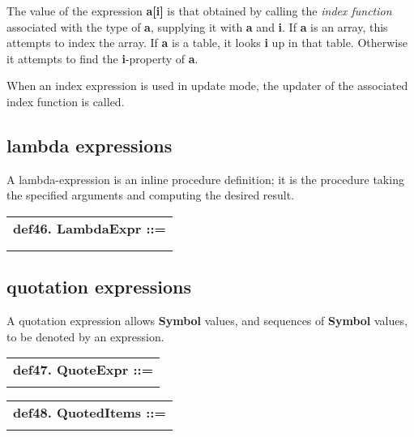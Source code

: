 \documentclass{report}
\begin{document}
The value of the expression {\bf a{[}i{]}} is that obtained by calling the
{\em index function} associated with the type of {\bf a}, supplying it with
{\bf a} and {\bf i}. If {\bf a} is an array, this attempts to index the array. If
{\bf a} is a table, it looks {\bf i} up in that table. Otherwise it attempts
to find the {\bf i}-property of {\bf a}.

When an index expression is used in update mode, the updater of the
associated index function is called.\subsection{lambda expressions}


A lambda-expression is an inline procedure definition; it is the
procedure taking the specified arguments and computing the desired
result.

\begin{tabular}{l}
{\bf def46. LambdaExpr ::= }\\ 
\hspace*{3mm}{\tt "(" Args "=$>$" StatementSeq ")"} \\ 
\hspace*{3mm}{\tt  $\mid$ "fun" Args "=$>$" StatementSeq "endfun"} \\ 
\end{tabular}

\subsection{quotation expressions}


A quotation expression allows {\bf Symbol} values, and sequences of {\bf Symbol}
values, to be denoted by an expression.

\begin{tabular}{l}
{\bf def47. QuoteExpr ::= }\\ 
\hspace*{3mm}{\tt "`" QuotedItems "`"} \\ 
\end{tabular}

\begin{tabular}{l}
{\bf def48. QuotedItems ::= }\\ 
\hspace*{3mm}{\tt QuotedItem*} \\ 
\end{tabular}
\end{document}
